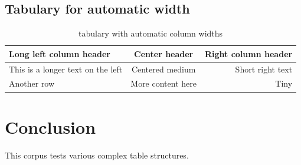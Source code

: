 \documentclass{article}
\begin{document}
\subsection{Tabulary for automatic width}

\begin{table}[ht]
\centering
\caption{tabulary with automatic column widths}
\label{tab:tabulary}
\begin{tabulary}{\linewidth}{|L|C|R|}
\hline
Long left column header & Center header & Right column header \\
\hline
This is a longer text on the left &
Centered medium &
Short right text \\
\hline
Another row &
More content here &
Tiny \\
\hline
\end{tabulary}
\end{table}

\section{Conclusion}

This corpus tests various complex table structures.
\end{document}
